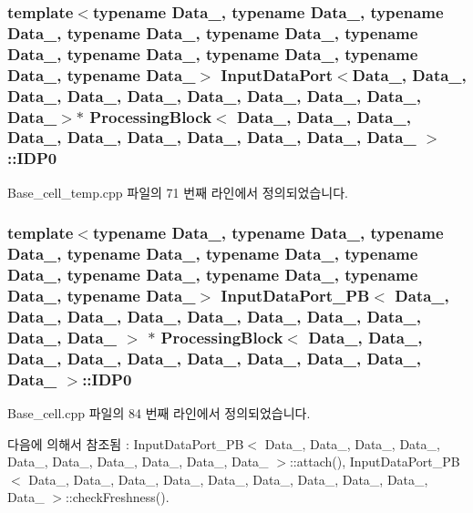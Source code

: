 \subsubsection[{\texorpdfstring{I\+D\+P0}{IDP0}}]{\setlength{\rightskip}{0pt plus 5cm}template$<$typename Data\+\_, typename Data\+\_, typename Data\+\_, typename Data\+\_, typename Data\+\_, typename Data\+\_, typename Data\+\_, typename Data\+\_, typename Data\+\_, typename Data\+\_$>$ {\bf Input\+Data\+Port}$<$Data\+\_, Data\+\_, Data\+\_, Data\+\_, Data\+\_, Data\+\_, Data\+\_, Data\+\_, Data\+\_, Data\+\_$>$$\ast$ {\bf Processing\+Block}$<$ Data\+\_, Data\+\_, Data\+\_, Data\+\_, Data\+\_, Data\+\_, Data\+\_, Data\+\_, Data\+\_, Data\+\_ $>$\+::I\+D\+P0}\hypertarget{classProcessingBlock_a44bddb9d36619bdd78a73459e432e51c}{}\label{classProcessingBlock_a44bddb9d36619bdd78a73459e432e51c}


Base\+\_\+cell\+\_\+temp.\+cpp 파일의 71 번째 라인에서 정의되었습니다.

\subsubsection[{\texorpdfstring{I\+D\+P0}{IDP0}}]{\setlength{\rightskip}{0pt plus 5cm}template$<$typename Data\+\_, typename Data\+\_, typename Data\+\_, typename Data\+\_, typename Data\+\_, typename Data\+\_, typename Data\+\_, typename Data\+\_, typename Data\+\_, typename Data\+\_$>$ {\bf Input\+Data\+Port\+\_\+\+PB}$<$ Data\+\_, Data\+\_, Data\+\_, Data\+\_, Data\+\_, Data\+\_, Data\+\_, Data\+\_, Data\+\_, Data\+\_ $>$ $\ast$ {\bf Processing\+Block}$<$ Data\+\_, Data\+\_, Data\+\_, Data\+\_, Data\+\_, Data\+\_, Data\+\_, Data\+\_, Data\+\_, Data\+\_ $>$\+::I\+D\+P0}\hypertarget{classProcessingBlock_af0d2cf1939ccf6d4485565dc740b6594}{}\label{classProcessingBlock_af0d2cf1939ccf6d4485565dc740b6594}


Base\+\_\+cell.\+cpp 파일의 84 번째 라인에서 정의되었습니다.



다음에 의해서 참조됨 \+:  Input\+Data\+Port\+\_\+\+P\+B$<$ Data\+\_, Data\+\_, Data\+\_, Data\+\_, Data\+\_, Data\+\_, Data\+\_, Data\+\_, Data\+\_, Data\+\_ $>$\+::attach(), Input\+Data\+Port\+\_\+\+P\+B$<$ Data\+\_, Data\+\_, Data\+\_, Data\+\_, Data\+\_, Data\+\_, Data\+\_, Data\+\_, Data\+\_, Data\+\_ $>$\+::check\+Freshness().


